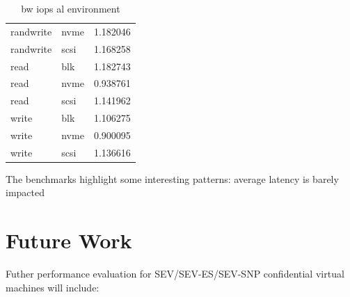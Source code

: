 \documentclass[twocolumn]{article}
\begin{document}
\begin{table}
\begin{tabular}{llr}
        randwrite & nvme & 1.182046 \\
        randwrite & scsi & 1.168258 \\
        read & blk & 1.182743 \\
        read & nvme & 0.938761 \\
        read & scsi & 1.141962 \\
        write & blk & 1.106275 \\
        write & nvme & 0.900095 \\
        write & scsi & 1.136616 \\
        \hline
    \end{tabular}
    \caption{bw iops al environment}
\end{table}

The benchmarks highlight some interesting patterns: average latency is barely impacted

\section{Future Work}
Futher performance evaluation for SEV/SEV-ES/SEV-SNP confidential virtual machines will include:
\end{document}
